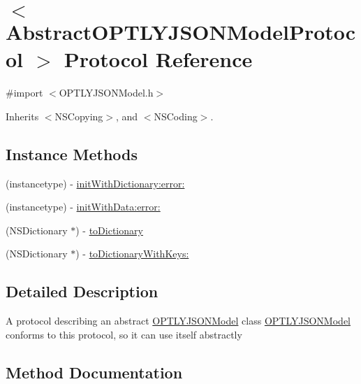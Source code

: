 \hypertarget{protocol_abstract_o_p_t_l_y_j_s_o_n_model_protocol_01-p}{}\section{$<$Abstract\+O\+P\+T\+L\+Y\+J\+S\+O\+N\+Model\+Protocol $>$ Protocol Reference}
\label{protocol_abstract_o_p_t_l_y_j_s_o_n_model_protocol_01-p}


{\ttfamily \#import $<$O\+P\+T\+L\+Y\+J\+S\+O\+N\+Model.\+h$>$}



Inherits $<$\+N\+S\+Copying$>$, and $<$\+N\+S\+Coding$>$.

\subsection*{Instance Methods}
\begin{DoxyCompactItemize}
\item 
(instancetype) -\/ \mbox{\hyperlink{protocol_abstract_o_p_t_l_y_j_s_o_n_model_protocol_01-p_a04d7259bbbe3915cf45d1c290bc29e69}{init\+With\+Dictionary\+:error\+:}}
\item 
(instancetype) -\/ \mbox{\hyperlink{protocol_abstract_o_p_t_l_y_j_s_o_n_model_protocol_01-p_a97c99c4fddbf463c00d93ec636b631f3}{init\+With\+Data\+:error\+:}}
\item 
(N\+S\+Dictionary $\ast$) -\/ \mbox{\hyperlink{protocol_abstract_o_p_t_l_y_j_s_o_n_model_protocol_01-p_a49abcea522cfa69004786000aaeb935a}{to\+Dictionary}}
\item 
(N\+S\+Dictionary $\ast$) -\/ \mbox{\hyperlink{protocol_abstract_o_p_t_l_y_j_s_o_n_model_protocol_01-p_ae7ec29d3e3b0044f07da386cf0a10d8d}{to\+Dictionary\+With\+Keys\+:}}
\end{DoxyCompactItemize}


\subsection{Detailed Description}
A protocol describing an abstract \mbox{\hyperlink{interface_o_p_t_l_y_j_s_o_n_model}{O\+P\+T\+L\+Y\+J\+S\+O\+N\+Model}} class \mbox{\hyperlink{interface_o_p_t_l_y_j_s_o_n_model}{O\+P\+T\+L\+Y\+J\+S\+O\+N\+Model}} conforms to this protocol, so it can use itself abstractly 

\subsection{Method Documentation}
\mbox{\label{protocol_abstract_o_p_t_l_y_j_s_o_n_model_protocol_01-p_a97c99c4fddbf463c00d93ec636b631f3}} 

